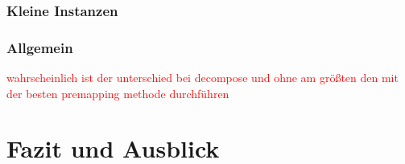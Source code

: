 \documentclass[11pt, a4paper, german]{article}
\begin{document}
\subsubsection{Kleine Instanzen}

\subsubsection{Allgemein}
\textcolor{red}{wahrscheinlich ist der unterschied bei decompose und ohne am größten den mit der besten premapping methode durchführen}

\section{Fazit und Ausblick}
\label{sec:fazit_und_ausblick}
	

\newpage
{}
\nocite{*}
\renewcommand{\refname}{11 \,\, Literaturverzeichnis}



\end{document}
